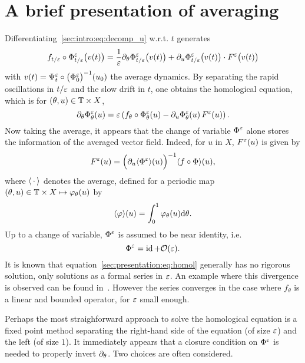 \section{A brief presentation of averaging} \label{sec:presentation}


Differentiating~\eqref{sec:intro:eq:decomp_u} w.r.t. \( t \) generates
\begin{equation*}
  f_{t/\varepsilon} \circ \Phi^{\varepsilon}_{t/\varepsilon} \big( v(t) \big) 
  = \frac{1}{\varepsilon} \partial_\theta \Phi^{\varepsilon}_{t/\varepsilon} \big( v(t) \big)
  + \partial_u \Phi^{\varepsilon}_{t/\varepsilon}\big( v(t) \big) \cdot F^{\varepsilon} \big( v(t) \big)
\end{equation*}
with \( v(t) = \Psi^{\varepsilon}_t \circ \big( \Phi^{\varepsilon}_0 \big)^{-1} (u_0) \) the
average dynamics. By separating the rapid oscillations in $t/\varepsilon$ and the
slow drift in $t$, one obtains the homological equation, which is for
$(\theta, u) \in \mathbb{T} \times X$, 
\begin{equation} \label{sec:presentation:eq:homol}
  \partial_\theta \Phi^{\varepsilon}_{\theta} (u)
  = \varepsilon \left( f_{\theta} \circ \Phi^{\varepsilon}_{\theta} (u) 
    - \partial_u \Phi^{\varepsilon}_{\theta} (u) \, F^{\varepsilon} (u) \right) .
\end{equation}
Now taking the average, it appears that the change of variable $\Phi^{\varepsilon}$
alone stores the information of the averaged vector field. Indeed, for $u$
in $X$, $F^{\varepsilon}(u)$ is given by
\begin{equation}
  F^{\varepsilon} (u) = \Big( \partial_u \langle \Phi^{\varepsilon} \rangle (u) \Big)^{-1} 
        \langle f \circ \Phi \rangle (u) ,
\end{equation}
where $\langle \,\cdot\, \rangle$ denotes the average, defined for a periodic map
$ (\theta, u) \in \mathbb{T} \times X \mapsto \varphi_\theta(u)$ by
\begin{equation}
  \langle \varphi \rangle (u) = \int_0^1 \varphi_\theta (u) \mathrm{d} \theta .
\end{equation}
Up to a change of variable, $\Phi^{\varepsilon}$ is assumed to be near identity,
i.e. 
\begin{equation}
  \Phi^{\varepsilon} = \operatorname{id} + \mathcal{O}(\varepsilon) .
\end{equation}
It is known that equation~\eqref{sec:presentation:eq:homol} generally has no
rigorous solution, only solutions as a formal series in $\varepsilon$. An example
where this divergence is observed can be found
in~\cite{chartier.2010.higher}. However the series converges in the
case where $f_\theta$ is a linear and bounded operator, for $\varepsilon$ small
enough. 

\bigskip
Perhaps the most straighforward approach to solve the homological equation
is a fixed point method separating the right-hand side of the equation (of
size $\varepsilon$) and the left (of size $1$). It immediately appears that a
closure condition on $\Phi^{\varepsilon}$ is needed to properly invert
$\partial_\theta$. Two choices are often considered.


